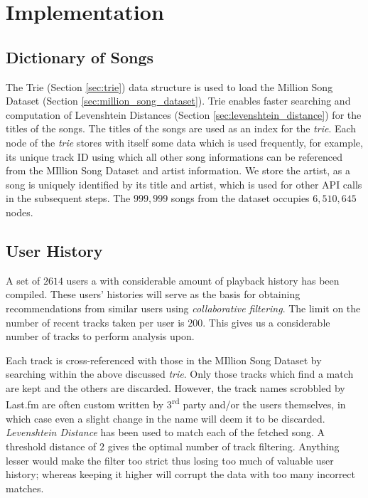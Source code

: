 \chapter{Implementation}

	\section{Dictionary of Songs}
		The Trie (Section \ref{sec:trie}) data structure is used to load the Million Song Dataset (Section \ref{sec:million_song_dataset}). Trie enables faster searching and computation of Levenshtein Distances (Section \ref{sec:levenshtein_distance}) for the titles of the songs. The titles of the songs are used as an index for the \emph{trie}. Each node of the \emph{trie} stores with itself some data which is used frequently, for example, its unique track ID using which all other song informations can be referenced from the MIllion Song Dataset and artist information. We store the artist, as a song is uniquely identified by its title and artist, which is used for other API calls in the subsequent steps. The \(999,999\) songs from the dataset occupies \(6,510,645\) nodes.
	
	\section{User History}
		A set of \(2614\) users a with considerable amount of playback history has been compiled. These users' histories will serve as the basis for obtaining recommendations from similar users using \emph{collaborative filtering}. The limit on the number of recent tracks taken per user is \(200\). This gives us a considerable number of tracks to perform analysis upon.
		
		Each track is cross-referenced with those in the MIllion Song Dataset by searching within the above discussed \emph{trie}. Only those tracks which find a match are kept and the others are discarded. However, the track names scrobbled by Last.fm are often custom written by 3\textsuperscript{rd} party and/or the users themselves, in which case even a slight change in the name will deem it to be discarded. \emph{Levenshtein Distance} has been used to match each of the fetched song. A threshold distance of \(2\) gives the optimal number of track filtering. Anything lesser would make the filter too strict thus losing too much of valuable user history; whereas keeping it higher will corrupt the data with too many incorrect matches.
		
